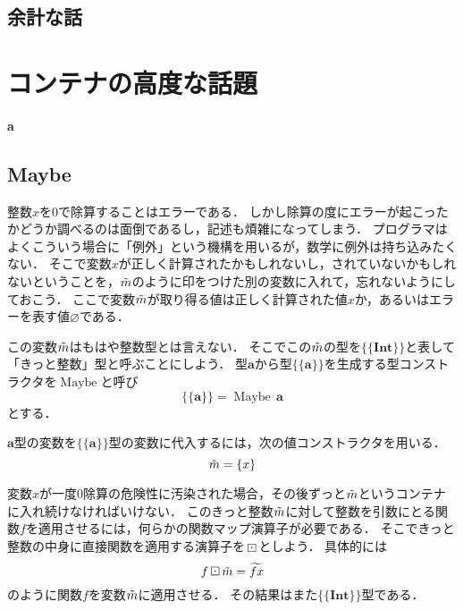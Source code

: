 \documentclass[twocolumn]{jsbook}
\newcommand{\hsklType}[1]{\textbf{#1}}
\newcommand{\hsklTypeConstructor}[1]{\mathop{\mathrm{#1}}}
\DeclareMathOperator{\hsklMaybeConstructor}{\hsklTypeConstructor{Maybe}}
\DeclareMathOperator{\hsklMaybeMap}{\boxdot}
\newcommand{\hsklInt}{\hsklType{Int}}
\newcommand{\hsklNothing}{\varnothing}
\newcommand{\hsklJust}[1]{\{#1\}}
\newcommand{\hsklMaybe}[1]{\Tilde{#1}}
\newcommand{\hsklMaybeW}[1]{\widetilde{#1}}
\newcommand{\hsklMaybeType}[1]{\{\!\{#1\}\!\}}
\newcommand{\hsklTypeConstruct}[2]{#1\,#2}
\newenvironment{leader}{\begingroup\bf}{\endgroup}
\newcommand{\typename}[1]{\mathbf{#1}}
\newcommand{\typeconstructor}[2]{\mathop{#1}\,#2}
\newcommand{\typeint}{\typename{Int}}
\newcommand{\typemaybe}{\typename{Maybe}}
\newcommand{\binarymaybefunctormap}{\boxdot}
\newcommand{\maybetype}[1]{\left\{#1\right\}}
\begin{document}
\section*{余計な話}

\chapter{コンテナの高度な話題}

\begin{leader}
a
\end{leader}


\section{Maybe}

整数$x$を$0$で除算することはエラーである．
しかし除算の度にエラーが起こったかどうか調べるのは面倒であるし，記述も煩雑になってしまう．
プログラマはよくこういう場合に「例外」という機構を用いるが，数学に例外は持ち込みたくない．
そこで変数$x$が正しく計算されたかもしれないし，されていないかもしれないということを，$\hsklMaybe{m}$のように印をつけた別の変数に入れて，忘れないようにしておこう．
ここで変数$\hsklMaybe{m}$が取り得る値は正しく計算された値$x$か，あるいはエラーを表す値$\hsklNothing$である．

この変数$\hsklMaybe{m}$はもはや整数型とは言えない．
そこでこの$\hsklMaybe{m}$の型を$\hsklMaybeType{\hsklInt}$と表して「きっと整数」型と呼ぶことにしよう．
型$\hsklType{a}$から型$\hsklMaybeType{\hsklType{a}}$を生成する型コンストラクタを$\hsklMaybeConstructor$と呼び$$\hsklMaybeType{\hsklType{a}}=\hsklTypeConstruct{\hsklMaybeConstructor}{\hsklType{a}}$$とする．

$\hsklType{a}$型の変数を$\hsklMaybeType{\hsklType{a}}$型の変数に代入するには，次の値コンストラクタを用いる．
$$\hsklMaybe{m}=\hsklJust{x}$$

変数$x$が一度$0$除算の危険性に汚染された場合，その後ずっと$\hsklMaybe{m}$というコンテナに入れ続けなければいけない．
このきっと整数$\hsklMaybe{m}$に対して整数を引数にとる関数$f$を適用させるには，何らかの関数マップ演算子が必要である．
そこできっと整数の中身に直接関数を適用する演算子を$\hsklMaybeMap$としよう．
具体的には$$f\hsklMaybeMap\hsklMaybe{m}=\hsklMaybeW{fx}$$のように関数$f$を変数$\hsklMaybe{m}$に適用させる．
その結果はまた$\hsklMaybeType{\hsklInt}$型である．
\end{document}
